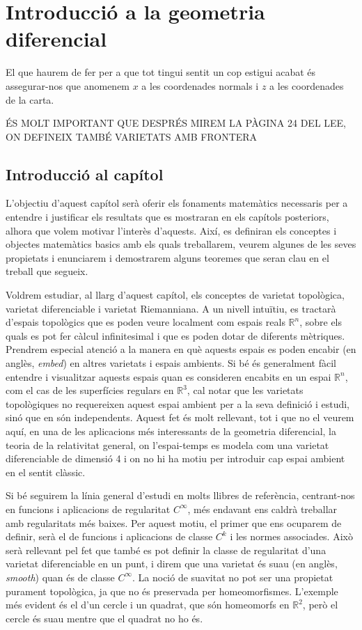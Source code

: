 \chapter{Introducció a la geometria diferencial}

{\color{red} El que haurem de fer per a que tot tingui sentit un cop estigui acabat és assegurar-nos que anomenem $x$ a les coordenades normals i $z$ a les coordenades de la carta.}

{\color{red} ÉS MOLT IMPORTANT QUE DESPRÉS MIREM LA PÀGINA 24 DEL LEE, ON DEFINEIX TAMBÉ VARIETATS AMB FRONTERA}

\section{Introducció al capítol}
L'objectiu d'aquest capítol serà oferir els fonaments matemàtics necessaris per a entendre i justificar els resultats que es mostraran en els capítols posteriors, alhora que volem motivar l'interès d'aquests. Així, es definiran els conceptes i objectes matemàtics basics amb els quals treballarem, veurem algunes de les seves propietats i enunciarem i demostrarem alguns teoremes que seran clau en el treball que segueix.

Voldrem estudiar, al llarg d'aquest capítol, els conceptes de varietat topològica, varietat diferenciable i varietat Riemanniana. A un nivell intuïtiu, es tractarà d'espais topològics que es poden veure localment com espais reals $\mathbb R^n$, sobre els quals es pot fer càlcul infinitesimal i que es poden dotar de diferents mètriques. Prendrem especial atenció a la manera en què aquests espais es poden encabir (en anglès, \textit{embed}) en altres varietats i espais ambients. Si bé és generalment fàcil entendre i visualitzar aquests espais quan es consideren encabits en un espai $\mathbb R^n$, com el cas de les superfícies regulars en $\mathbb R^3$, cal notar que les varietats topològiques no requereixen aquest espai ambient per a la seva definició i estudi, sinó que en són independents. Aquest fet és molt rellevant, tot i que no el veurem aquí, en una de les aplicacions més interessants de la geometria diferencial, la teoria de la relativitat general, on l'espai-temps es modela com una varietat diferenciable de dimensió 4 i on no hi ha motiu per introduir cap espai ambient en el sentit clàssic.

Si bé seguirem la línia general d'estudi en molts llibres de referència, centrant-nos en funcions i aplicacions de regularitat $C^\infty$, més endavant ens caldrà treballar amb regularitats més baixes. Per aquest motiu, el primer que ens ocuparem de definir, serà el de funcions i aplicacions de classe $C^k$ i les normes associades. Això serà rellevant pel fet que també es pot definir la classe de regularitat d'una varietat diferenciable en un punt, i direm que una varietat és suau (en anglès, \textit{smooth}) quan és de classe $C^\infty$. La noció de suavitat no pot ser una propietat purament topològica, ja que no és preservada per homeomorfismes. L'exemple més evident és el d'un cercle i un quadrat, que són homeomorfs en $\mathbb R^2$, però el cercle és suau mentre que el quadrat no ho és. 

